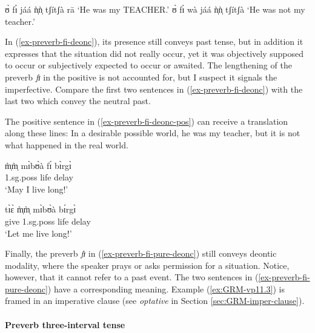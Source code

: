 \begin{exe}
\begin{exe}
\begin{exe}
{\begin{exe}
\begin{exe}
\begin{exe}
\begin{exe}
\begin{exe}
\begin{exe}
\begin{exe}
\begin{xlist}
\begin{exe}
\begin{exe}
\begin{exe}
\begin{exe}
\begin{exe}
\begin{exe}
\begin{exe}
\begin{exe}
\begin{exe}
\begin{exe}
\begin{exe}
\begin{exe}
\begin{exe}
\begin{exe}
\ex
 ʊ̀  fɪ̀ jáá  ǹ̩ǹ̩ tʃítʃà  rā  {\rm `He was my TEACHER.'}
\ex
 ʊ̀  fɪ̀ wà jáá  ǹ̩ǹ̩ tʃítʃà    {\rm `He was not my teacher.'}

\z 
 \z 


In (\ref{ex-preverb-fi-deonc}),  its presence still conveys  past
tense, but in addition it expresses that the situation did not really occur, yet
it was objectively supposed to occur or subjectively expected to occur or
awaited. The lengthening of the preverb {\it fɪ} in the positive  is not
accounted for, but I suspect it  signals the imperfective. Compare the first two
sentences in (\ref{ex-preverb-fi-deonc}) with the last two  which convey the
neutral past. 


The positive sentence in (\ref{ex-preverb-fi-deonc-pos}) can receive  a
translation along these lines:  In a desirable possible world, he was my
teacher, but it is not what happened in
the real world. 

\ea\label{ex-preverb-fi-pure-deonc}

\ea\label{ex:GRM-vp11.2}
\gll m̩̀m̩̀ mɪ̀bʊ̀à fɪ́  bɪ̀rgɪ̀ \\
    {\sc 1.sg.poss} life    {\mod}  delay    \\
\glt  `May I live long!' 

\ex\label{ex:GRM-vp11.3}
\gll tɪ̀ɛ̀ m̩̀m̩̀ mɪ̀bʊ̀à bɪ́rgɪ̀ \\
      give {\sc 1.sg.poss} life delay  \\
\glt  `Let me live long!' 

\z 
 \z 

Finally, the preverb {\it fɪ}  in (\ref{ex-preverb-fi-pure-deonc}) still conveys
 deontic modality, where the speaker prays or asks permission for a 
situation. Notice, however,  that it cannot refer to a past event. The two
sentences
in (\ref{ex-preverb-fi-pure-deonc}) have a corresponding meaning. Example
(\ref{ex:GRM-vp11.3}) is framed in an imperative clause (see  {\it 
optative} in 
Section
\ref{sec:GRM-imper-clause}). 


\paragraph{Preverb three-interval tense}
\label{sec:GRM-preverb-three-int-tense}


\end{exe}
\end{exe}
\end{exe}
\end{exe}
\end{exe}
\end{exe}
\end{exe}
\end{exe}
\end{exe}
\end{exe}
\end{exe}
\end{exe}
\end{exe}
\end{exe}
\end{xlist}
\end{exe}
\end{exe}
\end{exe}
\end{exe}
\end{exe}
\end{exe}
\end{exe}}
\end{exe}
\end{exe}
\end{exe}
